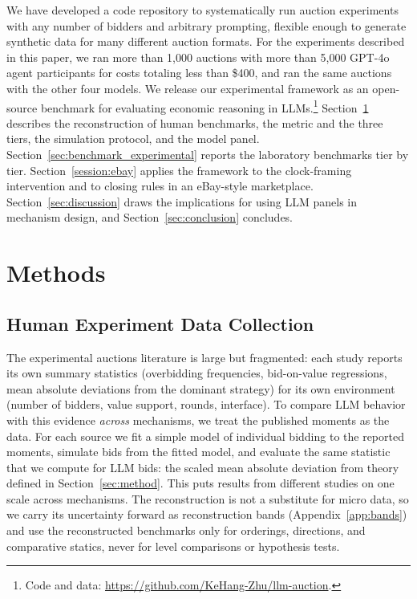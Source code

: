 \documentclass[acmsmall,screen,review]{acmart}
\begin{document}
We have developed a code repository to systematically run auction experiments with any number of bidders and arbitrary prompting, flexible enough to generate synthetic data for many different auction formats.
For the experiments described in this paper, we ran more than 1,000 auctions with more than 5,000 GPT-4o agent participants for costs totaling less than \$400, and ran the same auctions with the other four models.
We release our experimental framework as an open-source benchmark for evaluating economic reasoning in LLMs.\footnote{Code and data: \url{https://github.com/KeHang-Zhu/llm-auction}.}
Section~\ref{sec:general_method} describes the reconstruction of human benchmarks, the metric and the three tiers, the simulation protocol, and the model panel.
Section~\ref{sec:benchmark_experimental} reports the laboratory benchmarks tier by tier.
Section~\ref{session:ebay} applies the framework to the clock-framing intervention and to closing rules in an eBay-style marketplace.
Section~\ref{sec:discussion} draws the implications for using LLM panels in mechanism design, and Section~\ref{sec:conclusion} concludes.


\section{Methods}\label{sec:general_method}
\subsection{Human Experiment Data Collection}

The experimental auctions literature is large but fragmented: each study reports its own summary statistics (overbidding frequencies, bid-on-value regressions, mean absolute deviations from the dominant strategy) for its own environment (number of bidders, value support, rounds, interface). To compare LLM behavior with this evidence \emph{across} mechanisms, we treat the published moments as the data. For each source we fit a simple model of individual bidding to the reported moments, simulate bids from the fitted model, and evaluate the same statistic that we compute for LLM bids: the scaled mean absolute deviation from theory defined in Section~\ref{sec:method}. This puts results from different studies on one scale across mechanisms. The reconstruction is not a substitute for micro data, so we carry its uncertainty forward as reconstruction bands (Appendix~\ref{app:bands}) and use the reconstructed benchmarks only for orderings, directions, and comparative statics, never for level comparisons or hypothesis tests.
\end{document}
